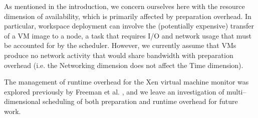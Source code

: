 As mentioned in the introduction, we concern ourselves here with the resource dimension of availability, which is primarily affected by preparation overhead. In particular, workspace deployment can involve the (potentially expensive) transfer of a VM image to a node, a task that requires I/O and network usage that must be accounted for by the scheduler. However, we currently assume that VMs produce no network activity that would share bandwidth with preparation overhead (i.e. the Networking dimension does not affect the Time dimension).

The management of runtime overhead for the Xen virtual machine monitor was explored previously by Freeman et al. \cite{DBLP:conf/icsoc/FreemanKFRSW06}, and we leave an investigation of multi--dimensional scheduling of both preparation and runtime overhead for future work.
